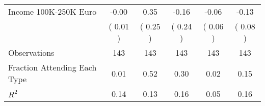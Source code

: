 \begin{table}[H]
{\begin{tabular}{lccccc}
\quad Income 100K-250K Euro &     -0.00 &      0.35 &     -0.16 &     -0.06 &     -0.13 \\
\quad  & (     0.01 ) & (     0.25 )  & (     0.24 )  & (     0.06 ) & (     0.08 ) \\
\midrule
Observations & 143 & 143 & 143 & 143 & 143 \\
Fraction Attending Each Type &      0.01 &      0.52 &      0.30 &      0.02 &      0.15 \\
\midrule
$ R^2$ &      0.14 &      0.13 &      0.16 &      0.05 &      0.16 \\
\bottomrule
\end{tabular}}
\end{table}
